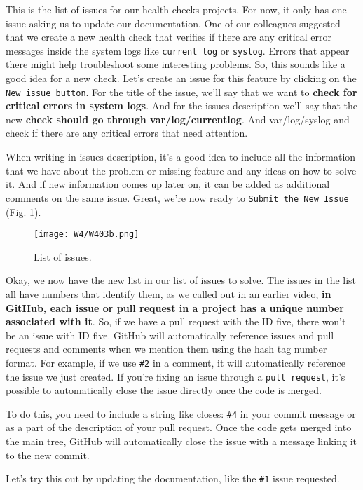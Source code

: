 	This is the list of issues for our health-checks projects. For now, it only has one issue asking us to update our documentation. One of our colleagues suggested that we create a new health check that verifies if there are any critical error messages inside the system logs like \texttt{current log} or \texttt{syslog}. Errors that appear there might help troubleshoot some interesting problems. So, this sounds like a good idea for a new check. 
	Let's create an issue for this feature by clicking on the \texttt{New issue button}. For the title of the issue, we'll say that we want to \textbf{check for critical errors in system logs}. And for the issues description we'll say that the new \textbf{check should go through var/log/currentlog}. And var/log/syslog and check if there are any critical errors that need attention.

	When writing in issues description, it's a good idea to include all the information that we have about the problem or missing feature and any ideas on how to solve it. And if new information comes up later on, it can be added as additional comments on the same issue. Great, we're now ready to \texttt{Submit the New Issue} (Fig. \ref{W403b}).

\begin{figure} 
	\caption{List of issues.}
	\centering
	\texttt{[image: W4/W403b.png]}
	\label{W403b}
\end{figure}

	Okay, we now have the new list in our list of issues to solve. The issues in the list all have numbers that identify them, as we called out in an earlier video, \textbf{in GitHub, each issue or pull request in a project has a unique number associated with it}. So, if we have a pull request with the ID five, there won't be an issue with ID five. GitHub will automatically reference issues and pull requests and comments when we mention them using the hash tag number format. For example, if we use \verb|#2| in a comment, it will automatically reference the issue we just created. If you're fixing an issue through a \texttt{pull request}, it's possible to automatically close the issue directly once the code is merged. 
	
	To do this, you need to include a string like closes: \verb|#4| in your commit message or as a part of the description of your pull request. Once the code gets merged into the main tree, GitHub will automatically close the issue with a message linking it to the new commit.
	
	Let's try this out by updating the documentation, like the \verb|#1| issue requested.

